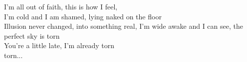 I'm all out of faith, this is how I feel, \\
I'm cold and I am shamed, lying naked on the floor \\
Illusion never changed, into something real,
I'm wide awake and I can see, the perfect sky is torn \\
You're a little late, I'm already torn \\
torn... \\

